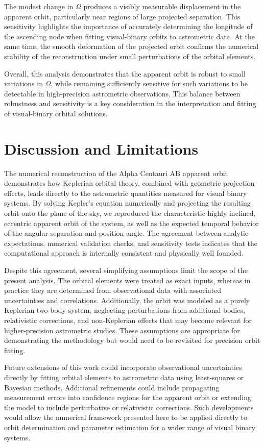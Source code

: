 \documentclass[11pt]{article}
\begin{document}
The modest change in $\Omega$ produces a visibly measurable displacement in the apparent orbit, particularly near regions of large projected separation. This sensitivity highlights the importance of accurately determining the longitude of the ascending node when fitting visual-binary orbits to astrometric data. At the same time, the smooth deformation of the projected orbit confirms the numerical stability of the reconstruction under small perturbations of the orbital elements.

Overall, this analysis demonstrates that the apparent orbit is robust to small variations in $\Omega$, while remaining sufficiently sensitive for such variations to be detectable in high-precision astrometric observations. This balance between robustness and sensitivity is a key consideration in the interpretation and fitting of visual-binary orbital solutions.

\section{Discussion and Limitations}

The numerical reconstruction of the Alpha Centauri AB apparent orbit demonstrates how Keplerian orbital theory, combined with geometric projection effects, leads directly to the astrometric quantities measured for visual binary systems. By solving Kepler’s equation numerically and projecting the resulting orbit onto the plane of the sky, we reproduced the characteristic highly inclined, eccentric apparent orbit of the system, as well as the expected temporal behavior of the angular separation and position angle. The agreement between analytic expectations, numerical validation checks, and sensitivity tests indicates that the computational approach is internally consistent and physically well founded.

Despite this agreement, several simplifying assumptions limit the scope of the present analysis. The orbital elements were treated as exact inputs, whereas in practice they are determined from observational data with associated uncertainties and correlations. Additionally, the orbit was modeled as a purely Keplerian two-body system, neglecting perturbations from additional bodies, relativistic corrections, and non-Keplerian effects that may become relevant for higher-precision astrometric studies. These assumptions are appropriate for demonstrating the methodology but would need to be revisited for precision orbit fitting.

Future extensions of this work could incorporate observational uncertainties directly by fitting orbital elements to astrometric data using least-squares or Bayesian methods. Additional refinements could include propagating measurement errors into confidence regions for the apparent orbit or extending the model to include perturbative or relativistic corrections. Such developments would allow the numerical framework presented here to be applied directly to orbit determination and parameter estimation for a wider range of visual binary systems.
\end{document}
